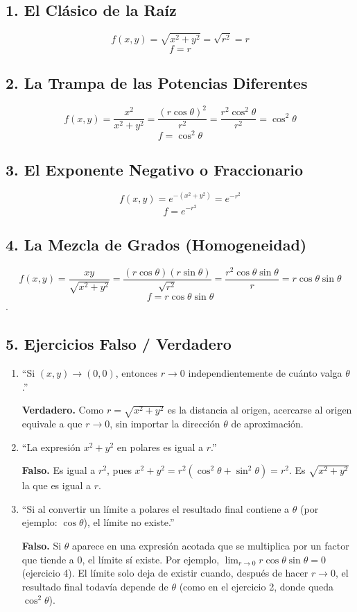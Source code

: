 \documentclass[50pt]{article}
\begin{document}
 
\subsection*{1. El Clásico de la Raíz}
\[
f(x,y)=\sqrt{x^2+y^2}=\sqrt{r^2}=r
\]
\[
\boxed{f=r}
\]
 
\subsection*{2. La Trampa de las Potencias Diferentes}
\[
f(x,y)=\frac{x^2}{x^2+y^2}=\frac{(r\cos\theta)^2}{r^2}=\frac{r^2\cos^2\theta}{r^2}=\cos^2\theta
\]
\[
\boxed{f=\cos^2\theta}
\]

 
\subsection*{3. El Exponente Negativo o Fraccionario}
\[
f(x,y)=e^{-(x^2+y^2)}=e^{-r^2}
\]
\[
\boxed{f=e^{-r^2}}
\]

 
\subsection*{4. La Mezcla de Grados (Homogeneidad)}
\[
f(x,y)=\frac{xy}{\sqrt{x^2+y^2}}=\frac{(r\cos\theta)(r\sin\theta)}{\sqrt{r^2}}=\frac{r^2\cos\theta\sin\theta}{r}=r\cos\theta\sin\theta
\]
\[
\boxed{f=r\cos\theta\sin\theta}
\]
.
 
\subsection*{5. Ejercicios Falso / Verdadero}
 
\begin{enumerate}
  \item ``Si $(x,y)\to(0,0)$, entonces $r\to0$ independientemente de cuánto valga $\theta$.''
 
  \textbf{Verdadero.} Como $r=\sqrt{x^2+y^2}$ es la distancia al origen, acercarse al origen equivale a que $r\to0$, sin importar la dirección $\theta$ de aproximación.
 
  \item ``La expresión $x^2+y^2$ en polares es igual a $r$.''
 
  \textbf{Falso.} Es igual a $r^2$, pues $x^2+y^2=r^2(\cos^2\theta+\sin^2\theta)=r^2$. Es $\sqrt{x^2+y^2}$ la que es igual a $r$.
 
  \item ``Si al convertir un límite a polares el resultado final contiene a $\theta$ (por ejemplo: $\cos\theta$), el límite no existe.''
 
  \textbf{Falso.} Si $\theta$ aparece en una expresión acotada que se multiplica por un factor que tiende a $0$, el límite sí existe. Por ejemplo, $\lim_{r\to0} r\cos\theta\sin\theta=0$ (ejercicio 4). El límite solo deja de existir cuando, después de hacer $r\to0$, el resultado final todavía depende de $\theta$ (como en el ejercicio 2, donde queda $\cos^2\theta$).
\end{enumerate}
 
\end{document}
